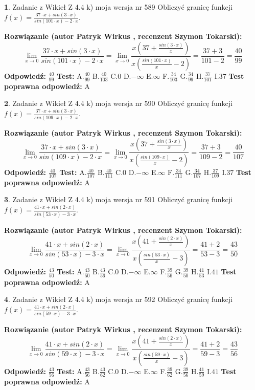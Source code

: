 \documentclass[12pt, a4paper]{article}
\theoremstyle{definition} %
\newtheorem{zad}{}
\newcommand{\zadStart}[1]{\begin{zad}#1\newline}
\newcommand{\zadStop}{\end{zad}}
\newcommand{\rozwStart}[2]{\noindent \textbf{Rozwiązanie (autor #1 , recenzent #2): }\newline}
\newcommand{\rozwStop}{\newline}
\newcommand{\odpStart}{\noindent \textbf{Odpowiedź:}\newline}
\newcommand{\odpStop}{\newline}
\newcommand{\testStart}{\noindent \textbf{Test:}\newline}
\newcommand{\testStop}{\newline}
\newcommand{\kluczStart}{\noindent \textbf{Test poprawna odpowiedź:}\newline}
\newcommand{\kluczStop}{\newline}
\begin{document}
\zadStart{Zadanie z Wikieł Z 4.4 k) moja wersja nr 589}
Obliczyć granicę funkcji $f(x)=\frac{37\cdot x +sin(3\cdot x)}{sin(101\cdot x) -2\cdot x}$.
\zadStop
\rozwStart{Patryk Wirkus}{Szymon Tokarski}
$$\lim\limits_{x\to 0}\frac{37\cdot x +sin(3\cdot x)}{sin(101\cdot x) -2\cdot x}
=\lim\limits_{x\to 0}\frac{x(37+\frac{sin(3\cdot x)}{x})}{x(\frac{sin(101\cdot x)}{x}-2)}
=\frac{37+3}{101-2} = \frac{40}{99}$$
\rozwStop
\odpStart
$\frac{40}{99}$
\odpStop
\testStart
A.$\frac{40}{99}$
B.$\frac{40}{103}$
C.$0$
D.$-\infty$
E.$\infty$
F.$\frac{34}{103}$
G.$\frac{34}{99}$
H.$\frac{37}{101}$
I.$37$
\testStop
\kluczStart
A
\kluczStop



\zadStart{Zadanie z Wikieł Z 4.4 k) moja wersja nr 590}
Obliczyć granicę funkcji $f(x)=\frac{37\cdot x +sin(3\cdot x)}{sin(109\cdot x) -2\cdot x}$.
\zadStop
\rozwStart{Patryk Wirkus}{Szymon Tokarski}
$$\lim\limits_{x\to 0}\frac{37\cdot x +sin(3\cdot x)}{sin(109\cdot x) -2\cdot x}
=\lim\limits_{x\to 0}\frac{x(37+\frac{sin(3\cdot x)}{x})}{x(\frac{sin(109\cdot x)}{x}-2)}
=\frac{37+3}{109-2} = \frac{40}{107}$$
\rozwStop
\odpStart
$\frac{40}{107}$
\odpStop
\testStart
A.$\frac{40}{107}$
B.$\frac{40}{111}$
C.$0$
D.$-\infty$
E.$\infty$
F.$\frac{34}{111}$
G.$\frac{34}{107}$
H.$\frac{37}{109}$
I.$37$
\testStop
\kluczStart
A
\kluczStop



\zadStart{Zadanie z Wikieł Z 4.4 k) moja wersja nr 591}
Obliczyć granicę funkcji $f(x)=\frac{41\cdot x +sin(2\cdot x)}{sin(53\cdot x) -3\cdot x}$.
\zadStop
\rozwStart{Patryk Wirkus}{Szymon Tokarski}
$$\lim\limits_{x\to 0}\frac{41\cdot x +sin(2\cdot x)}{sin(53\cdot x) -3\cdot x}
=\lim\limits_{x\to 0}\frac{x(41+\frac{sin(2\cdot x)}{x})}{x(\frac{sin(53\cdot x)}{x}-3)}
=\frac{41+2}{53-3} = \frac{43}{50}$$
\rozwStop
\odpStart
$\frac{43}{50}$
\odpStop
\testStart
A.$\frac{43}{50}$
B.$\frac{43}{56}$
C.$0$
D.$-\infty$
E.$\infty$
F.$\frac{39}{56}$
G.$\frac{39}{50}$
H.$\frac{41}{53}$
I.$41$
\testStop
\kluczStart
A
\kluczStop



\zadStart{Zadanie z Wikieł Z 4.4 k) moja wersja nr 592}
Obliczyć granicę funkcji $f(x)=\frac{41\cdot x +sin(2\cdot x)}{sin(59\cdot x) -3\cdot x}$.
\zadStop
\rozwStart{Patryk Wirkus}{Szymon Tokarski}
$$\lim\limits_{x\to 0}\frac{41\cdot x +sin(2\cdot x)}{sin(59\cdot x) -3\cdot x}
=\lim\limits_{x\to 0}\frac{x(41+\frac{sin(2\cdot x)}{x})}{x(\frac{sin(59\cdot x)}{x}-3)}
=\frac{41+2}{59-3} = \frac{43}{56}$$
\rozwStop
\odpStart
$\frac{43}{56}$
\odpStop
\testStart
A.$\frac{43}{56}$
B.$\frac{43}{62}$
C.$0$
D.$-\infty$
E.$\infty$
F.$\frac{39}{62}$
G.$\frac{39}{56}$
H.$\frac{41}{59}$
I.$41$
\testStop
\kluczStart
A
\kluczStop
\end{document}
